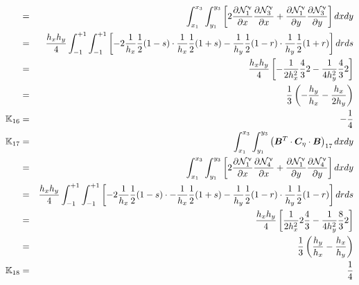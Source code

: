 \begin{eqnarray}
&=& \int_{x_1}^{x_3} \int_{y_1}^{y_3}
\left[
2\frac{\partial {\mathcal{N}}_1^\upnu}{\partial x}\frac{\partial {\mathcal{N}}_3^\upnu}{\partial x} 
+\frac{\partial {\mathcal{N}}_1^\upnu}{\partial y}\frac{\partial {\mathcal{N}}_3^\upnu}{\partial y}
\right] dxdy \nonumber\\
&=& \frac{h_xh_y}{4} \int_{-1}^{+1} \int_{-1}^{+1} 
\left[ 
-2 \frac{1}{h_x}\frac12 (1-s)\cdot  \frac{1}{h_x}\frac12 (1+s)
-\frac{1}{h_y}\frac12 (1-r)\cdot \frac{1}{h_y}\frac12 (1+r) 
\right] drds \nonumber\\
&=& \frac{h_xh_y}{4}
\left[
-\frac{1}{2h_x^2} \frac43 2 - \frac{1}{4h_y^2} \frac43 2
\right] \nonumber\\
&=&\frac13 \left( -\frac{h_y}{h_x} - \frac{h_x}{2h_y}  \right) \nonumber\\
{\mathbb{K}}_{16} &=& -\frac14 \nonumber\\
{\mathbb{K}}_{17} 
&=& \int_{x_1}^{x_3} \int_{y_1}^{y_3} 
\left({\bm B}^T \cdot {\bm C}_\eta \cdot {\bm B}\right)_{17} dx dy \nonumber\\
&=& \int_{x_1}^{x_3} \int_{y_1}^{y_3}
\left[
2\frac{\partial {\mathcal{N}}_1^\upnu}{\partial x}\frac{\partial {\mathcal{N}}_4^\upnu}{\partial x} 
+\frac{\partial {\mathcal{N}}_1^\upnu}{\partial y}\frac{\partial {\mathcal{N}}_4^\upnu}{\partial y}
\right] dxdy \nonumber\\
&=& \frac{h_xh_y}{4} \int_{-1}^{+1} \int_{-1}^{+1} 
\left[ 
-2 \frac{1}{h_x}\frac12 (1-s)\cdot  -\frac{1}{h_x}\frac12 (1+s)
-\frac{1}{h_y}\frac12 (1-r)\cdot \frac{1}{h_y}\frac12 (1-r) 
\right] drds \nonumber\\
&=& \frac{h_xh_y}{4}
\left[
\frac{1}{2h_x^2} 2 \frac43 - \frac{1}{4h_y^2} \frac83 2
\right] \nonumber\\
&=& \frac13 \left( \frac{h_y}{h_x} - \frac{h_x}{h_y}  \right) \nonumber\\
{\mathbb{K}}_{18} &=& \frac14 \nonumber
\end{eqnarray}

